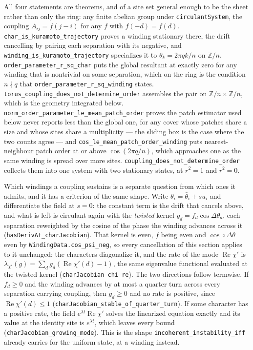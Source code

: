 \documentclass{article}
\begin{document}
All four statements are theorems, and of a site set general enough to be the sheet rather than only the ring: any finite abelian group under \texttt{circulantSystem}, the coupling $A_{ij}=f(j-i)$ for any $f$ with $f(-d)=f(d)$. \nolinkurl{char_is_kuramoto_trajectory} proves a winding stationary there, the drift cancelling by pairing each separation with its negative, and \nolinkurl{winding_is_kuramoto_trajectory} specializes it to $\theta_k=2\pi qk/n$ on $\mathbb{Z}/n$. \nolinkurl{order_parameter_r_sq_char} puts the global resultant at exactly zero for any winding that is nontrivial on some separation, which on the ring is the condition $n\nmid q$ that \nolinkurl{order_parameter_r_sq_winding} states. \nolinkurl{torus_coupling_does_not_determine_order} assembles the pair on $\mathbb{Z}/n\times\mathbb{Z}/n$, which is the geometry integrated below. \nolinkurl{norm_order_parameter_le_mean_patch_order} proves the patch estimator used below never reports less than the global one, for any cover whose patches share a size and whose sites share a multiplicity --- the sliding box is the case where the two counts agree --- and \nolinkurl{cos_le_mean_patch_order_winding} puts nearest-neighbour patch order at or above $\cos(2\pi q/n)$, which approaches one as the same winding is spread over more sites. \nolinkurl{coupling_does_not_determine_order} collects them into one system with two stationary states, at $r^2=1$ and $r^2=0$.

Which windings a coupling sustains is a separate question from which ones it admits, and it has a criterion of the same shape. Write $\theta_i=\bar\theta_i+su_i$ and differentiate the field at $s=0$: the constant term is the drift that cancels above, and what is left is circulant again with the \emph{twisted} kernel $g_d=f_d\cos\Delta\theta_d$, each separation reweighted by the cosine of the phase the winding advances across it (\nolinkurl{hasDerivAt_charJacobian}). That kernel is even, $f$ being even and $\cos\circ\Delta\theta$ even by \nolinkurl{WindingData.cos_psi_neg}, so every cancellation of this section applies to it unchanged: the characters diagonalize it, and the rate of the mode $\operatorname{Re}\chi'$ is $\lambda_{\chi'}(g)=\sum_d g_d(\operatorname{Re}\chi'(d)-1)$, the same eigenvalue functional evaluated at the twisted kernel (\nolinkurl{charJacobian_chi_re}). The two directions follow termwise. If $f_d\geq0$ and the winding advances by at most a quarter turn across every separation carrying coupling, then $g_d\geq0$ and no rate is positive, since $\operatorname{Re}\chi'(d)\leq1$ (\nolinkurl{charJacobian_stable_of_quarter_turn}). If some character has a positive rate, the field $e^{\lambda t}\operatorname{Re}\chi'$ solves the linearized equation exactly and its value at the identity site is $e^{\lambda t}$, which leaves every bound (\nolinkurl{charJacobian_growing_mode}). This is the shape \nolinkurl{incoherent_instability_iff} already carries for the uniform state, at a winding instead.
\end{document}
